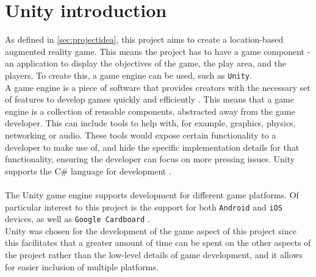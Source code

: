 \section{Unity introduction}\label{sec:unity-intro}
As defined in \autoref{sec:projectidea}, this project aims to create a location-based augmented reality game.
This means the project has to have a game component - an application to display the objectives of the game, the play area, and the players.
To create this, a game engine can be used, such as \texttt{Unity}. \\
A game engine is a piece of software that provides creators with the necessary set of features to develop games quickly and efficiently \cite{gameengine}.
This means that a game engine is a collection of reusable components, abstracted away from the game developer.
This can include tools to help with, for example, graphics, physics, networking or audio.
These tools would expose certain functionality to a developer to make use of, and hide the specific implementation details for that functionality, ensuring the developer can focus on more pressing issues.
Unity supports the C\# language for development \cite{unitylanguage}.
\\\\
The Unity game engine supports development for different game platforms.
Of particular interest to this project is the support for both \texttt{Android} and \texttt{iOS} devices, as well as \texttt{Google Cardboard} \cite{unityplatforms}.\\
Unity was chosen for the development of the game aspect of this project since this facilitates that a greater amount of time can be spent on the other aspects of the project rather than the low-level details of game development, and it allows for easier inclusion of multiple platforms.
